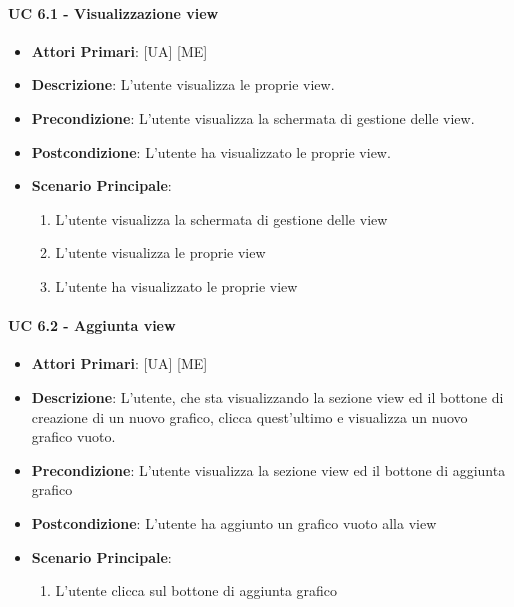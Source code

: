 			\paragraph{UC 6.1 - Visualizzazione view}
			\begin{itemize}
				\item \textbf{Attori Primari}: [UA] [ME]
				\item \textbf{Descrizione}: L'utente visualizza le proprie view.
				\item \textbf{Precondizione}: L'utente visualizza la schermata di gestione delle view.
				\item \textbf{Postcondizione}: L'utente ha visualizzato le proprie view.
				\item \textbf{Scenario Principale}:
				\begin{enumerate}
					\item{L'utente visualizza la schermata di gestione delle view}
					\item{L'utente visualizza le proprie view}
					\item{L'utente ha visualizzato le proprie view}
				\end{enumerate}	
			\end{itemize}

			\paragraph{UC 6.2 - Aggiunta view}
			\begin{itemize}
				\item \textbf{Attori Primari}: [UA] [ME]
				\item \textbf{Descrizione}: L'utente, che sta visualizzando la sezione view ed il bottone di creazione di un nuovo grafico, clicca quest'ultimo e visualizza un nuovo grafico vuoto.
				\item \textbf{Precondizione}: L'utente visualizza la sezione view ed il bottone di aggiunta grafico
				\item \textbf{Postcondizione}: L'utente ha aggiunto un grafico vuoto alla view
				\item \textbf{Scenario Principale}:
				\begin{enumerate}
					\item{L'utente clicca sul bottone di aggiunta grafico}
				\end{enumerate}	
			\end{itemize}

